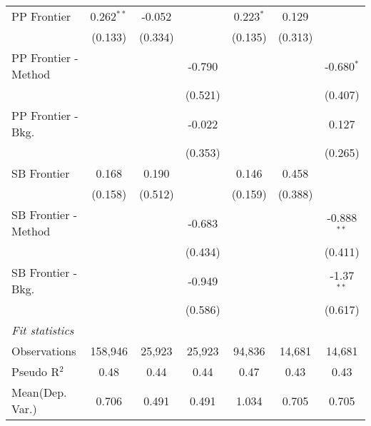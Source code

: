 \begin{tabular}{lcccccc}
   PP Frontier          & 0.262$^{**}$  & -0.052       &              & 0.223$^{*}$   & 0.129        &   \\   
                        & (0.133)       & (0.334)      &              & (0.135)       & (0.313)      &   \\   
   PP Frontier - Method &               &              & -0.790       &               &              & -0.680$^{*}$\\   
                        &               &              & (0.521)      &               &              & (0.407)\\   
   PP Frontier - Bkg.   &               &              & -0.022       &               &              & 0.127\\   
                        &               &              & (0.353)      &               &              & (0.265)\\   
   SB Frontier          & 0.168         & 0.190        &              & 0.146         & 0.458        &   \\   
                        & (0.158)       & (0.512)      &              & (0.159)       & (0.388)      &   \\   
   SB Frontier - Method &               &              & -0.683       &               &              & -0.888$^{**}$\\   
                        &               &              & (0.434)      &               &              & (0.411)\\   
   SB Frontier - Bkg.   &               &              & -0.949       &               &              & -1.37$^{**}$\\   
                        &               &              & (0.586)      &               &              & (0.617)\\   
   \midrule
   \emph{Fit statistics}\\
   Observations         & 158,946       & 25,923       & 25,923       & 94,836        & 14,681       & 14,681\\  
   Pseudo R$^2$         & 0.48          & 0.44         & 0.44         & 0.47          & 0.43         & 0.43\\  
Mean(Dep. Var.) & 0.706 & 0.491 & 0.491 & 1.034 & 0.705 & 0.705 \\
   

\end{tabular}
